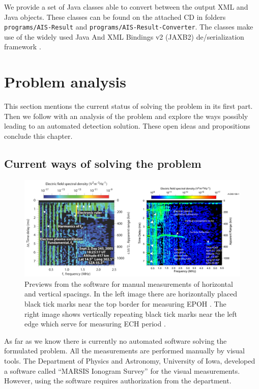 We provide a set of Java classes able to convert between the output XML and Java objects. These classes can be found on the attached CD in folders \texttt{programs/AIS-Result} and \texttt{programs/AIS-Result-Converter}. The classes make use of the widely used Java And XML Bindings v2 (JAXB2) de/serialization framework \citep{Java.net2013}.

\section{Problem analysis}
This section mentions the current status of solving the problem in its first part. Then we follow with an analysis of the problem and explore the ways possibly leading to an automated detection solution. These open ideas and propositions conclude this chapter.

\subsection{Current ways of solving the problem}  

\begin{figure}
	\centering
	\includegraphics[width=140mm]{images/rulers.png}
	\caption{Previews from the software for manual measurements of horizontal and vertical spacings. In the left image there are horizontally placed black tick marks near the top border for measuring EPOH \citep{Duru2008}. The right image shows vertically repeating black tick marks near the left edge which serve for measuring ECH period \citep{Akalin2010}.}
	\label{fig:rulers}
\end{figure}

As far as we know there is currently no automated software solving the formulated problem. All the measurements are performed manually by visual tools. The Department of Physics and Astronomy, University of Iowa, developed a software called ``MARSIS Ionogram Survey'' for the visual measurements. However, using the software requires authorization from the department.

